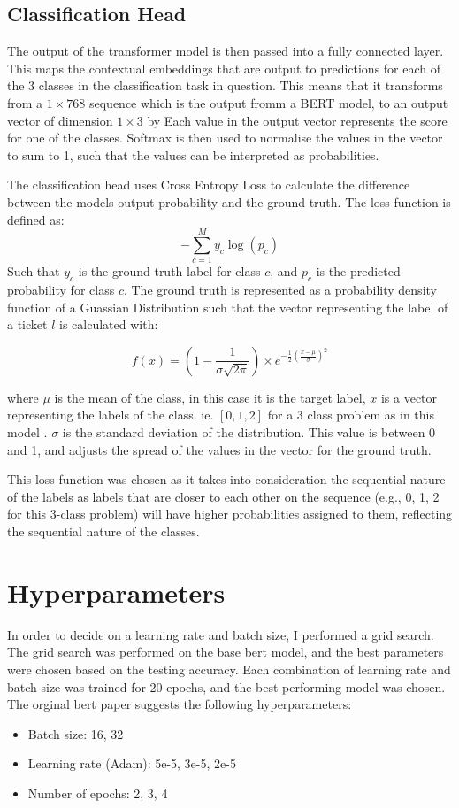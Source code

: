 \documentclass{UoYCSproject}
\begin{document}
    \subsection[classification-head]{Classification Head}
    The output of the transformer model is then passed into a fully connected layer.
    This maps the contextual embeddings that are output to predictions for each of the 3 classes in the classification task in question.
    This means that it transforms from a $1\times768$ sequence which is the output fromm a BERT model, to an output vector of dimension $1\times3$ by
    Each value in the output vector represents the score for one of the classes.
    Softmax is then used to normalise the values in the vector to sum to 1, such that the values can be interpreted as probabilities.

    The classification head uses Cross Entropy Loss to calculate the difference between the models output probability and the ground truth.
    The loss function is defined as:
    \[-\sum_{c=1}^My_{c}\log(p_{c})\]
    Such that $y_{c}$ is the ground truth label for class $c$, and $p_{c}$ is the predicted probability for class $c$.
    The ground truth is represented as a probability density function of a Guassian Distribution such that the vector representing the label of a ticket $l$ is calculated with:

    \[f(x) = (1-\frac{1}{\sigma \sqrt {2\pi}}) \times e ^{-\frac{1}{2}(\frac{x-\mu }{\sigma})^{2}}\]

    where $\mu$ is the mean of the class, in this case it is the target label, $x$ is a vector representing the labels of the class. ie. $[0,1,2]$ for a 3 class problem as in this model .
    $\sigma$ is the standard deviation of the distribution.
    This value is between 0 and 1, and adjusts the spread of the values in the vector for the ground truth.

    This loss function was chosen as it takes into consideration the sequential nature of the labels as labels that are closer to each other on the sequence (e.g., 0, 1, 2 for this 3-class problem) will have higher probabilities assigned to them, reflecting the sequential nature of the classes.

    \section{Hyperparameters}\label{sec:hyperparameters}
    In order to decide on a learning rate and batch size, I performed a grid search.
    The grid search was performed on the base bert model, and the best parameters were chosen based on the testing accuracy.
    Each combination of learning rate and batch size was trained for 20 epochs, and the best performing model was chosen.
    The orginal bert paper suggests the following hyperparameters:
    \begin{itemize}
        \item Batch size: 16, 32
        \item Learning rate (Adam): 5e-5, 3e-5, 2e-5
        \item Number of epochs: 2, 3, 4
    \end{itemize}
\end{document}
